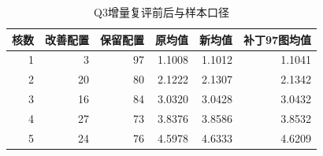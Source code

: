 \begin{table}[htbp]\centering
\caption{Q3增量复评前后与样本口径}\label{tab:q3_l2_patch_update}
\begin{tabular}{rrrrrr}\toprule
核数 & 改善配置 & 保留配置 & 原均值 & 新均值 & 补丁97图均值\\\midrule
1 & 3 & 97 & 1.1008 & 1.1012 & 1.1041\\
2 & 20 & 80 & 2.1222 & 2.1307 & 2.1342\\
3 & 16 & 84 & 3.0320 & 3.0428 & 3.0432\\
4 & 27 & 73 & 3.8376 & 3.8586 & 3.8532\\
5 & 24 & 76 & 4.5978 & 4.6333 & 4.6209\\
\bottomrule\end{tabular}
\end{table}
